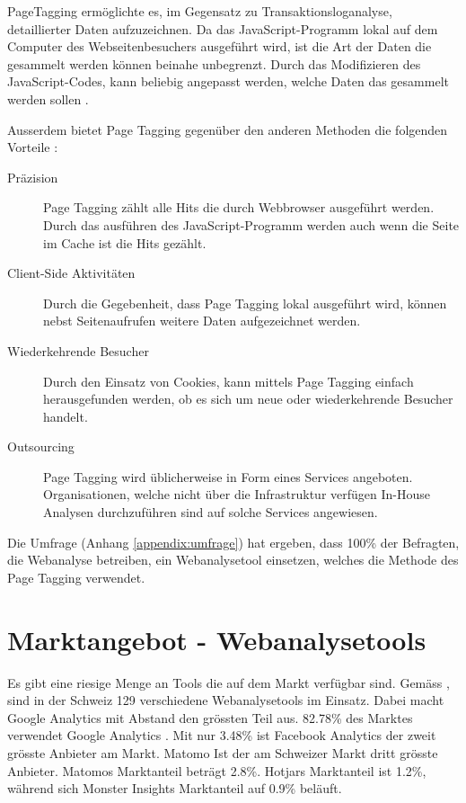 PageTagging ermöglichte es, im Gegensatz zu Transaktionsloganalyse, detaillierter Daten aufzuzeichnen. Da das JavaScript-Programm lokal auf dem Computer des Webseitenbesuchers ausgeführt wird, ist die Art der Daten die gesammelt werden können beinahe unbegrenzt. Durch das Modifizieren des JavaScript-Codes, kann beliebig angepasst werden, welche Daten das gesammelt werden sollen \parencite[S. 3]{waisberg2009webShort}. 

Ausserdem bietet Page Tagging gegenüber den anderen Methoden die folgenden Vorteile \parencite[S. 174]{nakatani2011toolselectionmethod}:

\begin{description}
  \item[Präzision] Page Tagging zählt alle Hits die durch Webbrowser ausgeführt werden. Durch das ausführen des JavaScript-Programm werden auch wenn die Seite im Cache ist die Hits gezählt.
  \item[Client-Side Aktivitäten] Durch die Gegebenheit, dass Page Tagging lokal ausgeführt wird, können nebst Seitenaufrufen weitere Daten aufgezeichnet werden.
  \item[Wiederkehrende Besucher] Durch den Einsatz von Cookies, kann mittels Page Tagging einfach herausgefunden werden, ob es sich um neue oder wiederkehrende Besucher handelt.
  \item[Outsourcing] Page Tagging wird üblicherweise in Form eines Services angeboten. Organisationen, welche nicht über die Infrastruktur verfügen In-House Analysen durchzuführen sind auf solche Services angewiesen.
\end{description}

Die Umfrage (Anhang \ref{appendix:umfrage}) hat ergeben, dass 100\% der Befragten, die Webanalyse betreiben, ein Webanalysetool einsetzen, welches die Methode des Page Tagging verwendet.

\newpage
\section{Marktangebot - Webanalysetools}\label{sec:marktangebotwebanalyse}
Es gibt eine riesige Menge an Tools die auf dem Markt verfügbar sind. Gemäss \parencite{datanyzeSwitzerlandWebanalytics}, sind in der Schweiz 129 verschiedene Webanalysetools im Einsatz. Dabei macht Google Analytics mit Abstand den grössten Teil aus. 82.78\% des Marktes verwendet Google Analytics . Mit nur 3.48\% ist Facebook Analytics der zweit grösste Anbieter am Markt. Matomo Ist der am Schweizer Markt dritt grösste Anbieter. Matomos Marktanteil beträgt 2.8\%. Hotjars Marktanteil ist 1.2\%, während sich Monster Insights Marktanteil auf 0.9\% beläuft. 

